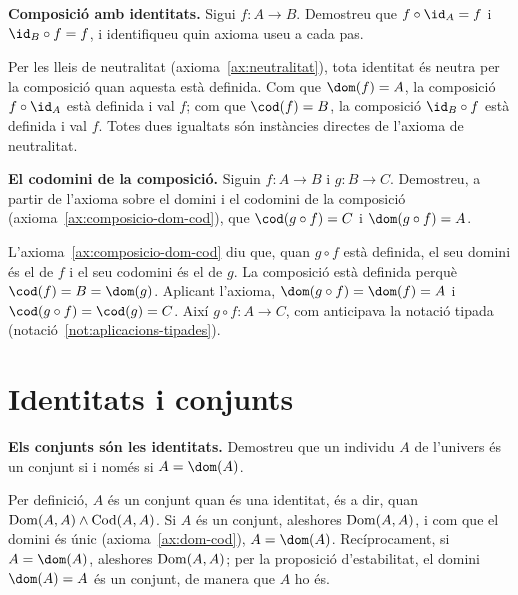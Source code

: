 \begin{exercici}
\textbf{Composició amb identitats.} Sigui \(f\colon A\to B\). Demostreu que \(f\circ\id_A=f\) i \(\id_B\circ f=f\), i identifiqueu quin axioma useu a cada pas.
\end{exercici}
\begin{solucio}
Per les lleis de neutralitat (axioma~\ref{ax:neutralitat}), tota identitat és neutra per la composició quan aquesta està definida. Com que \(\dom(f)=A\), la composició \(f\circ\id_A\) està definida i val \(f\); com que \(\cod(f)=B\), la composició \(\id_B\circ f\) està definida i val \(f\). Totes dues igualtats són instàncies directes de l'axioma de neutralitat.
\end{solucio}

\begin{exercici}
\textbf{El codomini de la composició.} Siguin \(f\colon A\to B\) i \(g\colon B\to C\). Demostreu, a partir de l'axioma sobre el domini i el codomini de la composició (axioma~\ref{ax:composicio-dom-cod}), que \(\cod(g\circ f)=C\) i \(\dom(g\circ f)=A\).
\end{exercici}
\begin{solucio}
L'axioma~\ref{ax:composicio-dom-cod} diu que, quan \(g\circ f\) està definida, el seu domini és el de \(f\) i el seu codomini és el de \(g\). La composició està definida perquè \(\cod(f)=B=\dom(g)\). Aplicant l'axioma, \(\dom(g\circ f)=\dom(f)=A\) i \(\cod(g\circ f)=\cod(g)=C\). Així \(g\circ f\colon A\to C\), com anticipava la notació tipada (notació~\ref{not:aplicacions-tipades}).
\end{solucio}

\section{Identitats i conjunts}\label{prac:identitats}

\begin{exercici}
\textbf{Els conjunts són les identitats.} Demostreu que un individu \(A\) de l'univers és un conjunt si i només si \(A=\dom(A)\).
\end{exercici}
\begin{solucio}
Per definició, \(A\) és un conjunt quan és una identitat, és a dir, quan \(\operatorname{Dom}(A,A)\land\operatorname{Cod}(A,A)\). Si \(A\) és un conjunt, aleshores \(\operatorname{Dom}(A,A)\), i com que el domini és únic (axioma~\ref{ax:dom-cod}), \(A=\dom(A)\). Recíprocament, si \(A=\dom(A)\), aleshores \(\operatorname{Dom}(A,A)\); per la proposició d'estabilitat, el domini \(\dom(A)=A\) és un conjunt, de manera que \(A\) ho és.
\end{solucio}

